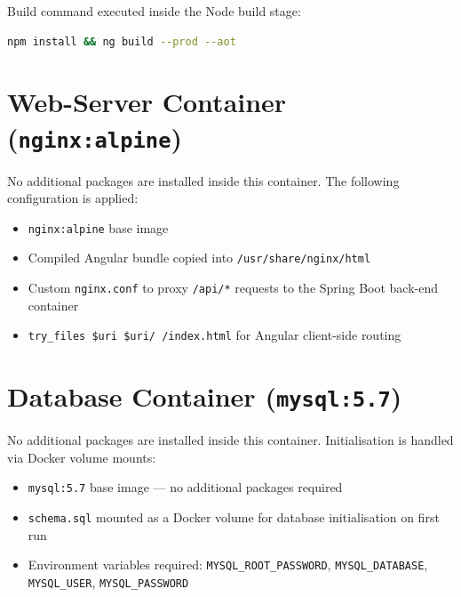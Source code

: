 \documentclass[12pt,letterpaper]{article}
\begin{document}
\vspace{0.5em}
Build command executed inside the Node build stage:

\begin{lstlisting}[language=bash]
npm install && ng build --prod --aot
\end{lstlisting}

\section{Web-Server Container \textnormal{\small(\texttt{nginx:alpine})}}

No additional packages are installed inside this container. The following
configuration is applied:

\begin{itemize}[noitemsep]
  \item \texttt{nginx:alpine} base image
  \item Compiled Angular bundle copied into \texttt{/usr/share/nginx/html}
  \item Custom \texttt{nginx.conf} to proxy \texttt{/api/*} requests to the
        Spring Boot back-end container
  \item \texttt{try\_files \$uri \$uri/ /index.html} for Angular client-side routing
\end{itemize}

\section{Database Container \textnormal{\small(\texttt{mysql:5.7})}}

No additional packages are installed inside this container. Initialisation
is handled via Docker volume mounts:

\begin{itemize}[noitemsep]
  \item \texttt{mysql:5.7} base image — no additional packages required
  \item \texttt{schema.sql} mounted as a Docker volume for database
        initialisation on first run
  \item Environment variables required: \texttt{MYSQL\_ROOT\_PASSWORD},
        \texttt{MYSQL\_DATABASE}, \texttt{MYSQL\_USER}, \texttt{MYSQL\_PASSWORD}
\end{itemize}

\end{document}
